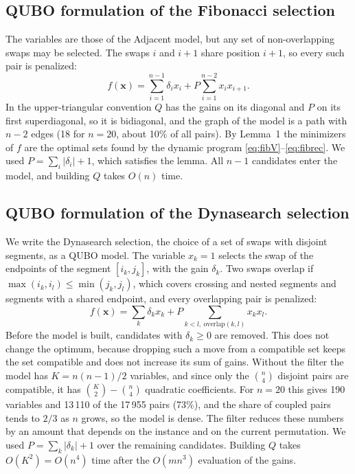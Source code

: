 \documentclass[10pt,twoside,twocolumn,a4paper]{article}
\newif\ifrevmarks \revmarksfalse
\newcommand{\rev}[1]{\ifrevmarks\textcolor{red}{#1}\else#1\fi}
\newenvironment{revblock}{\ifrevmarks\color{red}\fi}{}
\begin{document}
\subsection{\rev{QUBO formulation of the Fibonacci selection}}
\begin{revblock}
The variables are those of the Adjacent model, but any set of non-overlapping swaps may be selected. The swaps $i$ and $i+1$ share position $i+1$, so every such pair is penalized:
\begin{equation}
f(\mathbf{x})=\sum_{i=1}^{n-1}\delta_ix_i+P\sum_{i=1}^{n-2}x_ix_{i+1}.
\end{equation}
In the upper-triangular convention $Q$ has the gains on its diagonal and $P$ on its first superdiagonal, so it is bidiagonal, and the graph of the model is a path with $n-2$ edges (18 for $n=20$, about 10\% of all pairs). By Lemma~1 the minimizers of $f$ are the optimal sets found by the dynamic program \eqref{eq:fibV}--\eqref{eq:fibrec}. We used $P=\sum_i|\delta_i|+1$, which satisfies the lemma. All $n-1$ candidates enter the model, and building $Q$ takes $O(n)$ time.
\end{revblock}

\subsection{\rev{QUBO formulation of the Dynasearch selection}}
\begin{revblock}
We write the Dynasearch selection, the choice of a set of swaps with disjoint segments, as a QUBO model. The variable $x_k=1$ selects the swap of the endpoints of the segment $[i_k,j_k]$, with the gain $\delta_k$. Two swaps overlap if $\max(i_k,i_l)\le\min(j_k,j_l)$, which covers crossing and nested segments and segments with a shared endpoint, and every overlapping pair is penalized:
\begin{equation}
f(\mathbf{x})=\sum_k\delta_kx_k+P\sum_{k<l,\ \mathrm{overlap}(k,l)}x_kx_l.
\end{equation}
Before the model is built, candidates with $\delta_k\ge 0$ are removed. This does not change the optimum, because dropping such a move from a compatible set keeps the set compatible and does not increase its sum of gains. Without the filter the model has $K=n(n-1)/2$ variables, and since only the $\binom{n}{4}$ disjoint pairs are compatible, it has $\binom{K}{2}-\binom{n}{4}$ quadratic coefficients. For $n=20$ this gives 190 variables and 13\,110 of the 17\,955 pairs (73\%), and the share of coupled pairs tends to $2/3$ as $n$ grows, so the model is dense. The filter reduces these numbers by an amount that depends on the instance and on the current permutation. We used $P=\sum_k|\delta_k|+1$ over the remaining candidates. Building $Q$ takes $O(K^2)=O(n^4)$ time after the $O(mn^3)$ evaluation of the gains.
\end{revblock}
\end{document}
